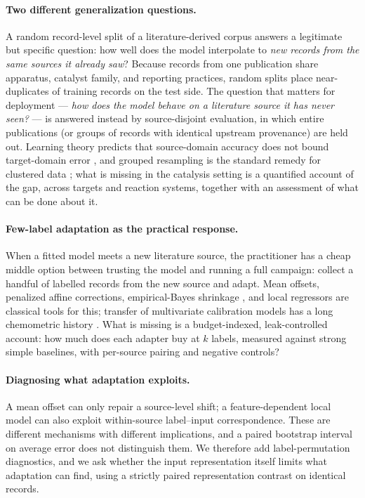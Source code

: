 \documentclass[11pt,a4paper]{article}
\begin{document}
\paragraph{Two different generalization questions.} A random record-level split of a
literature-derived corpus answers a legitimate but specific question: how well does the
model interpolate to \emph{new records from the same sources it already saw}? Because
records from one publication share apparatus, catalyst family, and reporting practices,
random splits place near-duplicates of training records on the test side. The question
that matters for deployment --- \emph{how does the model behave on a literature source it
has never seen?} --- is answered instead by source-disjoint evaluation, in which entire
publications (or groups of records with identical upstream provenance) are held out.
Learning theory predicts that source-domain accuracy does not bound target-domain error
\cite{bendavid}, and grouped resampling is the standard remedy for clustered data
\cite{roberts}; what is missing in the catalysis setting is a quantified account of
the gap, across targets and reaction systems, together with an assessment of what can be
done about it.

\paragraph{Few-label adaptation as the practical response.} When a fitted model meets a
new literature source, the practitioner has a cheap middle option between trusting the
model and running a full campaign: collect a handful of labelled records from the new
source and adapt. Mean offsets, penalized affine corrections, empirical-Bayes shrinkage
\cite{efron}, and local regressors are classical tools for this; transfer of
multivariate calibration models has a long chemometric history \cite{feudale}. What
is missing is a budget-indexed, leak-controlled account: how much does each adapter buy
at $k$ labels, measured against strong simple baselines, with per-source pairing and
negative controls?

\paragraph{Diagnosing what adaptation exploits.} A mean offset can only repair a
source-level shift; a feature-dependent local model can also exploit within-source
label--input correspondence. These are different mechanisms with different implications,
and a paired bootstrap interval on average error does not distinguish them. We therefore
add label-permutation diagnostics, and we ask whether the input representation itself
limits what adaptation can find, using a strictly paired representation contrast on
identical records.
\end{document}
